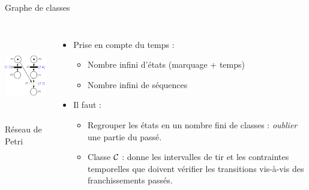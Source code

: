 \documentclass[compress]{beamer}
\begin{document}
\begin{frame}{Graphe de classes}
\begin{columns}
	\begin{center}
		\includegraphics[height=4cm]{rdp_temps_ch}\\
		Réseau de Petri 
	\end{center}
	\begin{itemize}
	\item Prise en compte du temps :
		\begin{itemize}
		\item Nombre infini d'états (marquage + temps)
		\item Nombre infini de séquences
		\end{itemize}
	\item Il faut :
		\begin{itemize}
		\item Regrouper les états en un nombre fini de classes : \emph{oublier} une partie du passé.
		\item Classe ${\cal C}$ : donne les  intervalles de tir et les contraintes temporelles que doivent vérifier les transitions vis-à-vis des franchissements passés.
		\end{itemize}
	\end{itemize}
\end{columns}
\end{frame}
\end{document}
